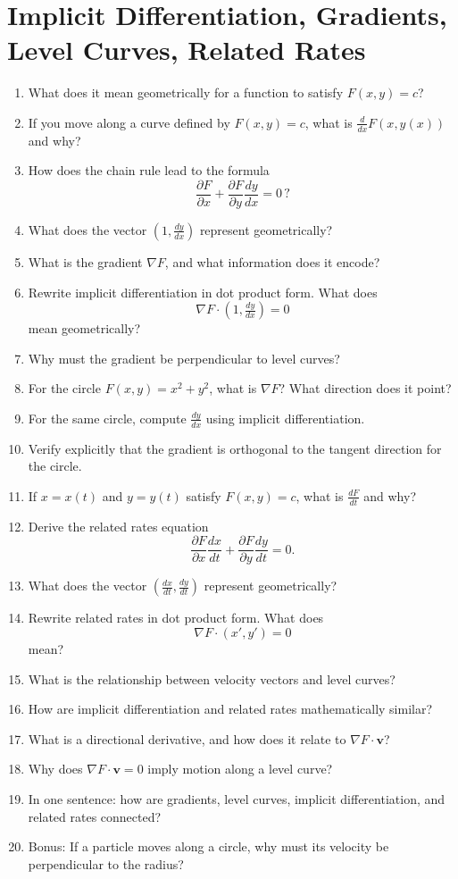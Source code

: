 \section{Implicit Differentiation, Gradients, Level Curves, Related Rates}

\begin{enumerate}
  \item What does it mean geometrically for a function to satisfy \(F(x,y) = c\)?
  \item If you move along a curve defined by \(F(x,y)=c\), what is \(\frac{d}{dx}F(x,y(x))\) and why?
  \item How does the chain rule lead to the formula
    \[ \frac{\partial F}{\partial x}+ \frac{\partial F}{\partial y}\frac{dy}{dx}= 0 \, ? \]
  \item What does the vector \(\left(1, \frac{dy}{dx}\right)\) represent geometrically?
  \item What is the gradient \(\nabla F\), and what information does it encode?
  \item Rewrite implicit differentiation in dot product form. What does
    \[ \nabla F \cdot (1, \tfrac{dy}{dx}) = 0 \]
    mean geometrically?
  \item Why must the gradient be perpendicular to level curves?
  \item For the circle \(F(x,y)=x^{2}+y^{2}\), what is \(\nabla F\)? What direction does it point?
  \item For the same circle, compute \(\frac{dy}{dx}\) using implicit differentiation.
  \item Verify explicitly that the gradient is orthogonal to the tangent direction for the circle.
  \item If \(x=x(t)\) and \(y=y(t)\) satisfy \(F(x,y)=c\), what is \(\frac{dF}{dt}\) and why?
  \item Derive the related rates equation
    \[ \frac{\partial F}{\partial x}\frac{dx}{dt}+ \frac{\partial F}{\partial y}\frac{dy}{dt}= 0. \]
  \item What does the vector \(\left(\frac{dx}{dt}, \frac{dy}{dt}\right)\) represent geometrically?
  \item Rewrite related rates in dot product form. What does
    \[ \nabla F \cdot (x', y') = 0 \]
    mean?
  \item What is the relationship between velocity vectors and level curves?
  \item How are implicit differentiation and related rates mathematically similar?
  \item What is a directional derivative, and how does it relate to \(\nabla F \cdot \mathbf{v}\)?
  \item Why does \(\nabla F \cdot \mathbf{v}= 0\) imply motion along a level curve?
  \item In one sentence: how are gradients, level curves, implicit differentiation, and related rates connected?
  \item Bonus: If a particle moves along a circle, why must its velocity be perpendicular to the radius?
\end{enumerate}
